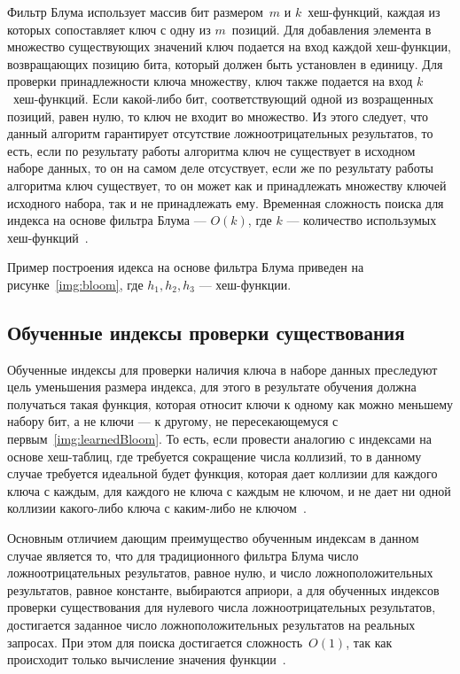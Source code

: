 Фильтр Блума использует массив бит размером~$m$ и $k$~хеш-функций, каждая из
которых сопоставляет ключ с одну из $m$~позиций. Для добавления элемента в
множество существующих значений ключ подается на вход каждой хеш-функции,
возвращающих позицию бита, который должен быть установлен в единицу. Для
проверки принадлежности ключа множеству, ключ также подается на вход
$k$~хеш-функций.  Если какой-либо бит, соответствующий одной из возращенных
позиций, равен нулю, то ключ не входит во множество. Из этого следует, что
данный алгоритм гарантирует отсутствие ложноотрицательных результатов, то есть,
если по результату работы алгоритма ключ не существует в исходном наборе данных,
то он на самом деле отсуствует, если же по результату работы алгоритма ключ
существует, то он может как и принадлежать множеству ключей исходного набора,
так и не принадлежать ему. Временная сложность поиска для индекса на основе
фильтра Блума --- $O(k)$, где $k$ --- количество использумых
хеш-функций~\cite{ship}.

Пример построения идекса на основе фильтра Блума приведен на
рисунке~\ref{img:bloom}, где $h_1, h_2, h_3$ --- хеш-функции.


\subsection{Обученные индексы проверки существования}

Обученные индексы для проверки наличия ключа в наборе данных преследуют цель
уменьшения размера индекса, для этого в результате обучения должна получаться
такая функция, которая относит ключи к одному как можно меньшему набору бит, а
не ключи --- к другому, не пересекающемуся с первым~\ref{img:learnedBloom}. То
есть, если провести аналогию с индексами на основе хеш-таблиц, где требуется
сокращение числа коллизий, то в данному случае требуется идеальной будет
функция, которая дает коллизии для каждого ключа с каждым, для каждого не ключа
с каждым не ключом, и не дает ни одной коллизии какого-либо ключа с каким-либо
не ключом~\cite{main}.

Основным отличием дающим преимущество обученным индексам в данном случае
является то, что для традиционного фильтра Блума число ложноотрицательных
результатов, равное нулю, и число ложноположительных результатов, равное
константе, выбираются априори, а для обученных индексов проверки существования
для нулевого числа ложноотрицательных результатов, достигается заданное число
ложноположительных результатов на реальных запросах. При этом для поиска
достигается сложность~$O(1)$, так как происходит только вычисление значения
функции~\cite{main}.


